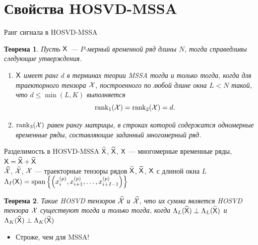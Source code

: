 \documentclass[pdf, unicode, 9pt, notheorems, handout]{beamer}
\newtheorem{theorem}{Теорема}
\begin{document}
    \section{Свойства HOSVD-MSSA}\label{sec:hosvd-mssa-properties}
    \begin{frame}{Ранг сигнала в HOSVD-MSSA}
        \begin{theorem}
            Пусть $\mathsf{X}$ --- $P$-мерный временной ряд длины $N$, тогда справедливы следующие утверждения.
            \begin{enumerate}
                \item $\mathsf{X}$ имеет ранг $d$ в терминах теории \textup{MSSA} тогда и только тогда, когда для траекторного тензора $\mathcal{X}$, построенного по любой длине окна $L<N$ такой, что 
                $d \leqslant\min(L, K)$ выполняется 
                \[\operatorname{rank}_1(\mathcal{X}) = \operatorname{rank}_2(\mathcal{X}) = d.\]
                \item $\operatorname{rank}_3(\mathcal{X})$ равен рангу матрицы, 
                в строках которой содержатся одномерные временные ряды, составляющие заданный 
                многомерный ряд.
            \end{enumerate}
        \end{theorem}
    \end{frame}
    
    \begin{frame}{Разделимость в HOSVD-MSSA}
        $\widehat{\mathsf{X}}$, $\widetilde{\mathsf{X}}$, $\mathsf{X}$ --- многомерные временные ряды, $\mathsf{X} = \widehat{\mathsf{X}} + \widetilde{\mathsf{X}}$\\ \vspace{0.1cm}
        $\widehat{\mathcal{X}}$, $\widetilde{\mathcal{X}}$, $\mathcal{X}$ --- траекторные тензоры рядов 
        $\widehat{\mathsf{X}}$, $\widetilde{\mathsf{X}}$, $\mathsf{X}$ с длиной
        окна $L$\\ \vspace{0.2cm}
        $\Lambda_I(\mathsf{X}) = \operatorname{span}\left\{\left(x_i^{(p)}, x_{i+1}^{(p)}, \ldots, x_{i + I - 1}^{(p)}\right)\right\}$
        \begin{theorem}
            Такие HOSVD тензоров $\widehat{\mathcal{X}}$ и $\widetilde{\mathcal{X}}$, что их сумма является HOSVD тензора $\mathcal{X}$
            существуют тогда и только тогда, когда
            $\Lambda_L(\widehat{\mathsf{X}}) \perp \Lambda_L(\widetilde{\mathsf{X}})$ и $\Lambda_K(\widehat{\mathsf{X}})\perp\Lambda_K(\widetilde{\mathsf{X}})$
        \end{theorem}
        \vspace{0.2cm}
        \begin{itemize}
            \item Строже, чем для MSSA!
        \end{itemize}
    \end{frame}
    
\end{document}
